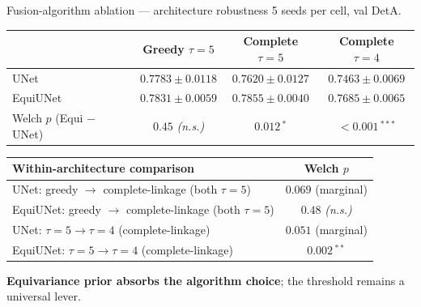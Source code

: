 \documentclass[10pt,aspectratio=169]{beamer}
\newcommand{\hilite}[1]{\textbf{\color{blue!60!black}#1}}
\begin{document}
\begin{frame}{Fusion-algorithm ablation --- architecture robustness}
  5 seeds per cell, val DetA.

  \vspace{2mm}
  \centering
  \footnotesize
  \begin{tabular}{l c c c}
    \toprule
                                 & Greedy $\tau{=}5$       & Complete $\tau{=}5$     & Complete $\tau{=}4$     \\
    \midrule
    UNet                         & $0.7783 \pm 0.0118$    & $0.7620 \pm 0.0127$     & $0.7463 \pm 0.0069$     \\
    EquiUNet                     & $0.7831 \pm 0.0059$    & \hilite{$0.7855 \pm 0.0040$} & $0.7685 \pm 0.0065$ \\
    \midrule
    Welch $p$ (Equi $-$ UNet)    & $0.45$ \textit{(n.s.)} & \hilite{$0.012\,^{*}$}  & \hilite{$<\!0.001\,^{***}$} \\
    \bottomrule
  \end{tabular}
  \normalsize

  \vspace{3mm}
  \centering
  \footnotesize
  \begin{tabular}{l c}
    \toprule
    Within-architecture comparison                            & Welch $p$ \\
    \midrule
    UNet: greedy $\to$ complete-linkage (both $\tau{=}5$)       & $0.069$ \quad (marginal) \\
    EquiUNet: greedy $\to$ complete-linkage (both $\tau{=}5$)   & $0.48$ \quad \textit{(n.s.)} \\
    UNet: $\tau{=}5 \to \tau{=}4$ (complete-linkage)            & $0.051$ \quad (marginal) \\
    EquiUNet: $\tau{=}5 \to \tau{=}4$ (complete-linkage)        & $0.002\,^{**}$ \\
    \bottomrule
  \end{tabular}
  \normalsize

  \vspace{2mm}
  \footnotesize \hilite{Equivariance prior absorbs the algorithm choice}; the
  threshold remains a universal lever.
\end{frame}
\end{document}
